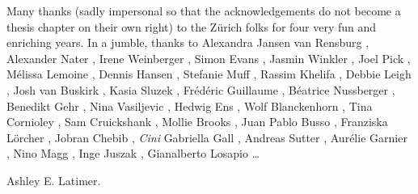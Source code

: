 Many thanks (sadly impersonal so that the acknowledgements do not become a thesis chapter on their own right) to the Z\"urich folks for four very fun and enriching years. In a jumble, thanks to 
Alexandra Jansen van Rensburg 
, Alexander Nater
, Irene Weinberger
, Simon Evans
, Jasmin Winkler
, Joel Pick
, M\'elissa Lemoine
, Dennis Hansen
, Stefanie Muff
, Rassim Khelifa
, Debbie Leigh
, Josh van Buskirk 
, Kasia Sluzek
, Fr\'ed\'eric Guillaume
, Béatrice Nussberger
, Benedikt Gehr	
, Nina Vasiljevic
, Hedwig Ens
, Wolf Blanckenhorn
, Tina Cornioley
, Sam Cruickshank
, Mollie Brooks
, Juan Pablo Busso
, Franziska L\"orcher
, Jobran Chebib
, \emph{Cini} Gabriella Gall
, Andreas Sutter
, Aur\'elie Garnier
, Nino Magg
, Inge Juszak
, Gianalberto Losapio
\dots




Ashley E. Latimer.

